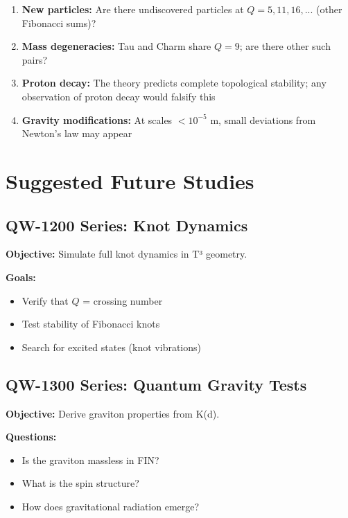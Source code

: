 \documentclass[11pt,a4paper]{book}
\theoremstyle{remark}
\begin{document}
\begin{enumerate}
    \item \textbf{New particles:} Are there undiscovered particles at $Q = 5, 11, 16, ...$ (other Fibonacci sums)?
    
    \item \textbf{Mass degeneracies:} Tau and Charm share $Q = 9$; are there other such pairs?
    
    \item \textbf{Proton decay:} The theory predicts complete topological stability; any observation of proton decay would falsify this
    
    \item \textbf{Gravity modifications:} At scales $< 10^{-5}$ m, small deviations from Newton's law may appear
\end{enumerate}

\section{Suggested Future Studies}

\subsection{QW-1200 Series: Knot Dynamics}

\textbf{Objective:} Simulate full knot dynamics in T³ geometry.

\textbf{Goals:}
\begin{itemize}
    \item Verify that $Q$ = crossing number
    \item Test stability of Fibonacci knots
    \item Search for excited states (knot vibrations)
\end{itemize}

\subsection{QW-1300 Series: Quantum Gravity Tests}

\textbf{Objective:} Derive graviton properties from K(d).

\textbf{Questions:}
\begin{itemize}
    \item Is the graviton massless in FIN?
    \item What is the spin structure?
    \item How does gravitational radiation emerge?
\end{itemize}
\end{document}
